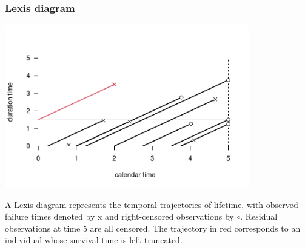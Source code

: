 \documentclass{beamer}
\begin{document}
\begin{frame}
\frametitle{Lexis diagram}
 \begin{center}
  \includegraphics[width = 0.8\textwidth]{img/c7/07-lexis_en.pdf}
 \end{center}
{ \footnotesize A Lexis diagram represents the temporal trajectories of lifetime, with observed failure times denoted by $\mathrm{x}$ and right-censored observations by $\circ$. Residual observations at time $5$ are all censored. The trajectory in red corresponds to an individual whose survival time is left-truncated.

}
\end{frame}
\end{document}
